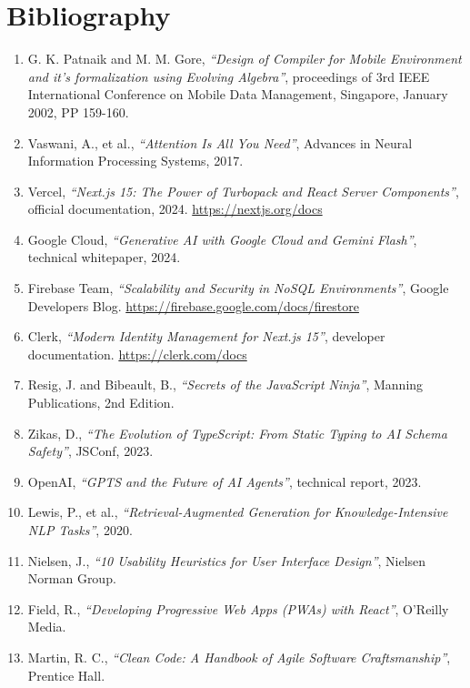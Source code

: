 \chapter{Bibliography}


\begin{enumerate}
    \item[1] G. K. Patnaik and M. M. Gore, \textit{``Design of Compiler for Mobile Environment and it’s formalization using Evolving Algebra''}, proceedings of 3rd IEEE International Conference on Mobile Data Management, Singapore, January 2002, PP 159-160.
    \item[2] Vaswani, A., et al., \textit{``Attention Is All You Need''}, Advances in Neural Information Processing Systems, 2017.
    \item[3] Vercel, \textit{``Next.js 15: The Power of Turbopack and React Server Components''}, official documentation, 2024. \url{https://nextjs.org/docs}
    \item[4] Google Cloud, \textit{``Generative AI with Google Cloud and Gemini Flash''}, technical whitepaper, 2024.
    \item[5] Firebase Team, \textit{``Scalability and Security in NoSQL Environments''}, Google Developers Blog. \url{https://firebase.google.com/docs/firestore}
    \item[6] Clerk, \textit{``Modern Identity Management for Next.js 15''}, developer documentation. \url{https://clerk.com/docs}
    \item[7] Resig, J. and Bibeault, B., \textit{``Secrets of the JavaScript Ninja''}, Manning Publications, 2nd Edition.
    \item[8] Zikas, D., \textit{``The Evolution of TypeScript: From Static Typing to AI Schema Safety''}, JSConf, 2023.
    \item[9] OpenAI, \textit{``GPTS and the Future of AI Agents''}, technical report, 2023.
    \item[10] Lewis, P., et al., \textit{``Retrieval-Augmented Generation for Knowledge-Intensive NLP Tasks''}, 2020.
    \item[11] Nielsen, J., \textit{``10 Usability Heuristics for User Interface Design''}, Nielsen Norman Group.
    \item[12] Field, R., \textit{``Developing Progressive Web Apps (PWAs) with React''}, O'Reilly Media.
    \item[13] Martin, R. C., \textit{``Clean Code: A Handbook of Agile Software Craftsmanship''}, Prentice Hall.

\end{enumerate}
